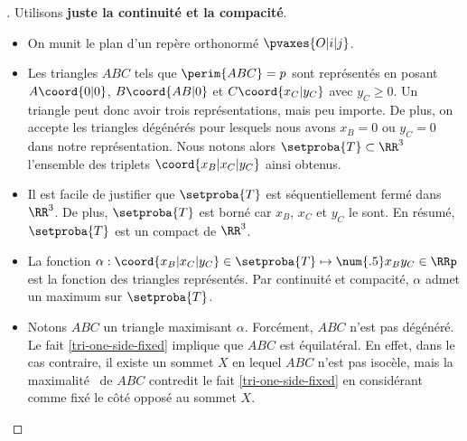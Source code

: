 

\begin{proof}[] \label{tri-topo-comp}
    Utilisons \textbf{juste la continuité et la compacité}.%
    \begin{itemize}
        \item On munit le plan d'un repère orthonormé $\pvaxes{O | i | j}$.

        \item Les triangles $ABC$ tels que $\perim{ABC} = p$ sont représentés en posant $A\coord{0 | 0}$, $B\coord{AB | 0}$ et $C\coord{x_C | y_C}$ avec $y_C \geq 0$. Un triangle peut donc avoir trois représentations, mais peu importe.
        De plus, on accepte les triangles dégénérés pour lesquels nous avons $x_B = 0$ ou $y_C = 0$ dans notre représentation.
        Nous notons alors $\setproba{T} \subset \RR^3$ l'ensemble des triplets $\coord{x_B | x_C | y_C}$ ainsi obtenus.

        \item Il est facile de justifier que $\setproba{T}$ est séquentiellement fermé dans $\RR^3$.
        De plus, $\setproba{T}$ est borné car $x_B$, $x_C$ et $y_C$ le sont.
        En résumé, $\setproba{T}$ est un compact de $\RR^3$.

        \item La fonction $\alpha: \coord{x_B | x_C | y_C} \in \setproba{T} \mapsto \num{.5} x_B y_C \in \RRp$ est la fonction  des triangles représentés.
        Par continuité et compacité, $\alpha$ admet un maximum sur $\setproba{T}$.


        \item Notons $ABC$ un triangle maximisant $\alpha$.
        Forcément, $ABC$ n'est pas dégénéré.
        Le fait \ref{tri-one-side-fixed} implique que $ABC$ est équilatéral.
        En effet,
        dans le cas contraire, il existe un sommet $X$ en lequel $ABC$ n'est pas isocèle, mais la \og maximalité \fg\ de $ABC$ contredit le fait \ref{tri-one-side-fixed} en considérant comme fixé le côté opposé au sommet $X$.
    \end{itemize}

    \null\vspace{-6ex}
\end{proof}




